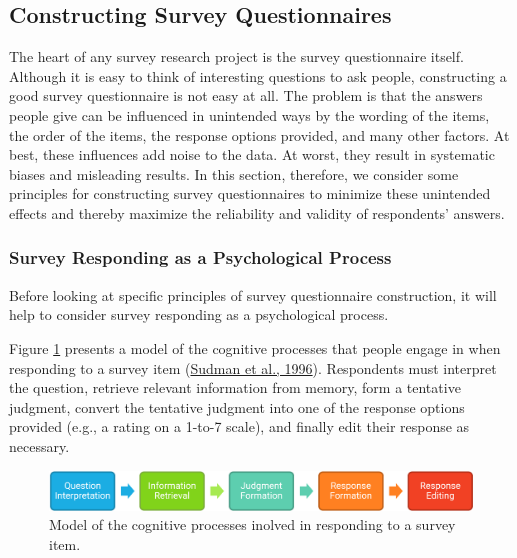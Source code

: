 \documentclass[
]{krantz}
\begin{document}
\hypertarget{constructing-survey-questionnaires}{%
\subsection{Constructing Survey Questionnaires}\label{constructing-survey-questionnaires}}

The heart of any survey research project is the survey questionnaire itself. Although it is easy to think of interesting questions to ask people, constructing a good survey questionnaire is not easy at all. The problem is that the answers people give can be influenced in unintended ways by the wording of the items, the order of the items, the response options provided, and many other factors. At best, these influences add noise to the data. At worst, they result in systematic biases and misleading results. In this section, therefore, we consider some principles for constructing survey questionnaires to minimize these unintended effects and thereby maximize the reliability and validity of respondents' answers.

\hypertarget{survey-responding-as-a-psychological-process}{%
\subsubsection*{Survey Responding as a Psychological Process}\label{survey-responding-as-a-psychological-process}}


Before looking at specific principles of survey questionnaire construction, it will help to consider survey responding as a psychological process.

Figure \ref{fig:cogsurvey} presents a model of the cognitive processes that people engage in when responding to a survey item (\protect\hyperlink{ref-sudman1996thinking}{Sudman et al., 1996}). Respondents must interpret the question, retrieve relevant information from memory, form a tentative judgment, convert the tentative judgment into one of the response options provided (e.g., a rating on a 1-to-7 scale), and finally edit their response as necessary.

\begin{figure}

{\centering \includegraphics[width=0.95\linewidth]{images/nonexperiments/cogsurvey} 

}

\caption{Model of the cognitive processes inolved in responding to a survey item.}\label{fig:cogsurvey}
\end{figure}
\end{document}
